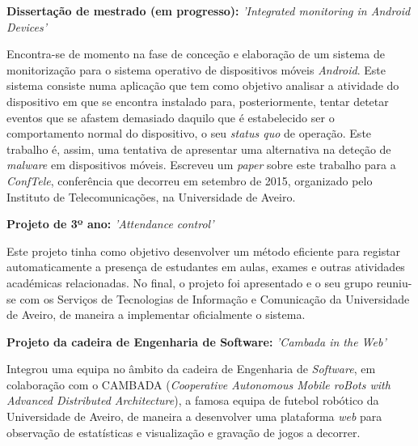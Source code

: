 \documentclass[11pt,a4paper,sans]{moderncv} %
\begin{document}
\vspace{5pt}

\begin{itemize}

\item{\textbf{Dissertação de mestrado (em progresso): } \textit{'Integrated
      monitoring in Android Devices'}

\vspace{3pt}

\small{Encontra-se de momento na fase de conceção e elaboração de um sistema de
  monitorização para o sistema operativo de dispositivos móveis
  \textit{Android}. Este sistema consiste numa aplicação que tem como objetivo
  analisar a atividade do dispositivo em que se encontra instalado para,
  posteriormente, tentar detetar eventos que se afastem demasiado daquilo que é
  estabelecido ser o comportamento normal do dispositivo, o seu \textit{status
    quo} de operação. Este trabalho é, assim, uma tentativa de apresentar uma
  alternativa na deteção de \textit{malware} em dispositivos móveis. Escreveu um
  \textit{paper} sobre este trabalho para a \textit{ConfTele}, conferência que
  decorreu em setembro de 2015, organizado pelo Instituto de Telecomunicações,
  na Universidade de Aveiro.}

\item{\textbf{Projeto de 3º ano: } \textit{'Attendance control'}

\vspace{3pt}

\small{Este projeto tinha como objetivo desenvolver um método eficiente para
  registar automaticamente a presença de estudantes em aulas, exames e outras
  atividades académicas relacionadas. No final, o projeto foi apresentado e o
  seu grupo reuniu-se com os Serviços de Tecnologias de Informação e Comunicação
  da Universidade de Aveiro, de maneira a implementar oficialmente o sistema.}}

\vspace{6pt}

\item{\textbf{Projeto da cadeira de Engenharia de Software: }\textit{'Cambada
      in the Web'}}

\vspace{3pt}

\small{Integrou uma equipa no âmbito da cadeira de Engenharia de
  \textit{Software}, em colaboração com o CAMBADA (\textit{Cooperative
    Autonomous Mobile roBots with Advanced Distributed Architecture}), a famosa
  equipa de futebol robótico da Universidade de Aveiro, de maneira a desenvolver
  uma plataforma \textit{web} para observação de estatísticas e visualização e
  gravação de jogos a decorrer.}}


\end{itemize}
\end{document}

